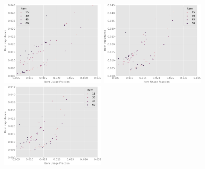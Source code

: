 \documentclass[onecolumn, compsoc,9pt]{IEEEtran}
\begin{document}
\clearpage




\clearpage




\begin{table}

  

\end{table}
\begin{table}

  

\end{table}
\begin{table}

  

\end{table}

\clearpage


\begin{table}
\fontsize{6}{7}\selectfont 
  

\end{table}
\begin{table}

\fontsize{6}{7}\selectfont   

\end{table}
\begin{table}
\fontsize{6}{7}\selectfont  

\end{table}



\begin{figure}
\includegraphics[width=2in]{./SSvDBDB/3IMPFRACsczsceff}
\includegraphics[width=2in]{./SSvDBDB/6IMPFRACsczsceff}
\includegraphics[width=2in]{./SSvDBDB/9IMPFRACsczsceff}
\end{figure}

\clearpage
\end{document}
